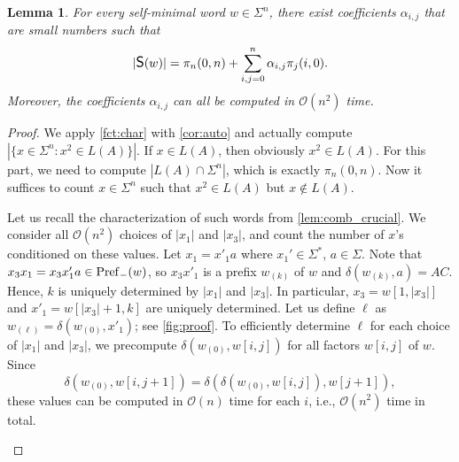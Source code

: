 \documentclass{article}
\newcommand{\Oh}{\mathcal{O}}
\newcommand{\CS}{\mbox{\large{\sf{S}}}}
\newtheorem{lemma}[theorem]{Lemma}
\theoremstyle{definition}
\theoremstyle{remark}
\begin{document}
\begin{lemma}\label{lem:cs}
  For every self-minimal word $w\in \Sigma^n$, there exist coefficients $\alpha_{i,j}$ that are small numbers such that
  $$|\CS(w)| = \pi_n(0,n)+\sum_{i,j=0}^n \alpha_{i,j} \pi_j(i,0).$$
  Moreover, the coefficients $\alpha_{i,j}$ can all be computed in $\Oh(n^2)$ time.
\end{lemma}
\begin{proof}
  We apply \cref{fct:char} with \cref{cor:auto} and actually compute
  $|\{x\in \Sigma^n: x^2\in L(A)\}|$.
  If $x\in L(A)$, then obviously $x^2\in L(A)$.
  For this part, we need to compute $|L(A) \cap \Sigma^n|$, which is exactly $\pi_n(0,n)$.
  Now it suffices to count $x\in \Sigma^n$ such that $x^2\in L(A)$ but $x\notin L(A)$.

  Let us recall the characterization of such words from \cref{lem:comb_crucial}.
  We consider all $\Oh(n^2)$ choices of $|x_1|$ and $|x_3|$,
  and count the number of $x$'s conditioned on these values.
  Let $x_1 = x'_1a$ where $x_1'\in \Sigma^*$, $a\in \Sigma$.
  Note that $x_3x_1=x_3x'_1a\in \mathrm{Pref}_{-}(w)$, so $x_3x'_1$ is a prefix $w_{(k)}$ of $w$
  and $\delta(w_{(k)},a) = AC$.
  Hence, $k$ is uniquely determined by $|x_1|$ and $|x_3|$.
  In particular, $x_3=w[1,|x_3|]$ and $x'_1=w[|x_3|+1,k]$ are uniquely determined.
  Let us define $\ell$ as $w_{(\ell)}=\delta(w_{(0)},x'_1)$;
see \cref{fig:proof}.
  To efficiently determine $\ell$ for each choice of $|x_1|$ and $|x_3|$, we precompute $\delta(w_{(0)},w[i,j])$ for all factors $w[i,j]$ of $w$.
  Since \[\delta(w_{(0)},w[i,j+1])=\delta(\delta(w_{(0)},w[i,j]),w[j+1]),\] these values can be computed in $\Oh(n)$ time for each $i$,
  i.e., $\Oh(n^2)$ time in total.

\begin{figure}[htpb]
\end{figure}
\end{proof}
\end{document}
